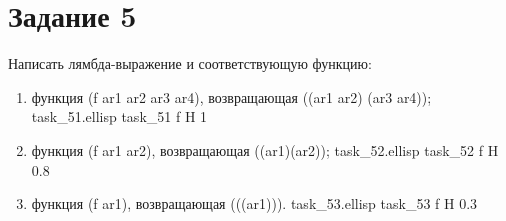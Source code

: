 \section{Задание 5}

Написать лямбда-выражение и соответствующую функцию:

\begin{enumerate}
	\item функция (f ar1 ar2 ar3 ar4), возвращающая ((ar1 ar2) (ar3 ar4));
		{task_51.el}{lisp}{}
		{task_51}
		{f}
		{H}
		{1\textwidth}
		{}
	\item функция (f ar1 ar2), возвращающая ((ar1)(ar2));
		{task_52.el}{lisp}{}
		{task_52}
		{f}
		{H}
		{0.8\textwidth}
		{}
	\item функция (f ar1), возвращающая (((ar1))).
		{task_53.el}{lisp}{}
		{task_53}
		{f}
		{H}
		{0.3\textwidth}
		{}
\end{enumerate}
